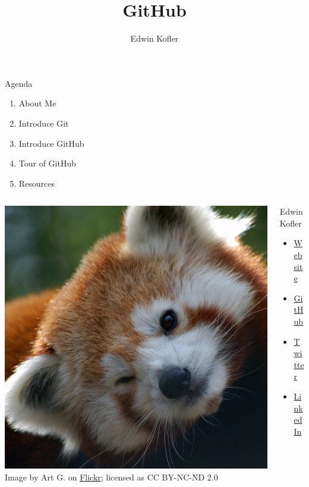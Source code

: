 \documentclass{beamer}
\title{GitHub}
\author{Edwin Kofler}
\begin{document}
\frame{\titlepage}

\begin{frame}{Agenda}
	\begin{enumerate}
		\item About Me
		\item Introduce Git
		\item Introduce GitHub
		\item Tour of GitHub
		\item Resources
	\end{enumerate}
\end{frame}

\begin{frame}
	\begin{columns}
		\begin{column}{0.48\textwidth}
			\includegraphics{panda-500px.jpg} \newline
			{ \tiny Image by Art G. on \href{https://www.flickr.com/photos/digitalart/4084550022}{Flickr}; licensed as CC BY-NC-ND 2.0 }
		\end{column}
		\begin{column}{0.48\textwidth}
			{\Huge Edwin Kofler} \newline
			\begin{itemize}
				\item \href{https://edwinkofler.com/}{Website}
				\item \href{https://github.com/hyperupcall}{GitHub}
				\item \href{https://twitter.com/hyperupcall}{Twitter}
				\item \href{https://www.linkedin.com/in/hyperupcall}{LinkedIn}
			\end{itemize}
		\end{column}
	\end{columns}
\end{frame}
\end{document}
